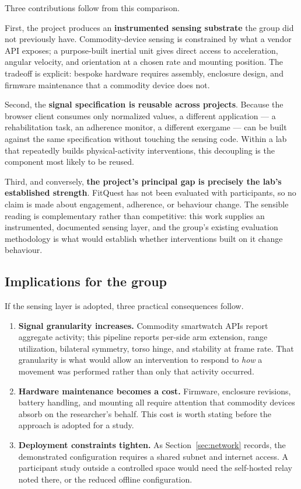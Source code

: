 \documentclass[11pt,a4paper]{article}
\begin{document}
Three contributions follow from this comparison.

First, the project produces an \textbf{instrumented sensing substrate} the group
did not previously have. Commodity-device sensing is constrained by what a
vendor API exposes; a purpose-built inertial unit gives direct access to
acceleration, angular velocity, and orientation at a chosen rate and mounting
position. The tradeoff is explicit: bespoke hardware requires assembly,
enclosure design, and firmware maintenance that a commodity device does not.

Second, the \textbf{signal specification is reusable across projects}. Because
the browser client consumes only normalized values, a different application
--- a rehabilitation task, an adherence monitor, a different exergame --- can be
built against the same specification without touching the sensing code. Within a
lab that repeatedly builds physical-activity interventions, this decoupling is
the component most likely to be reused.

Third, and conversely, \textbf{the project's principal gap is precisely the
lab's established strength}. FitQuest has not been evaluated with participants,
so no claim is made about engagement, adherence, or behaviour change. The
sensible reading is complementary rather than competitive: this work supplies an
instrumented, documented sensing layer, and the group's existing evaluation
methodology is what would establish whether interventions built on it change
behaviour.

\subsection{Implications for the group}

If the sensing layer is adopted, three practical consequences follow.

\begin{enumerate}
\item \textbf{Signal granularity increases.} Commodity smartwatch APIs report
aggregate activity; this pipeline reports per-side arm extension, range
utilization, bilateral symmetry, torso hinge, and stability at frame rate. That
granularity is what would allow an intervention to respond to \emph{how} a
movement was performed rather than only that activity occurred.

\item \textbf{Hardware maintenance becomes a cost.} Firmware, enclosure
revisions, battery handling, and mounting all require attention that commodity
devices absorb on the researcher's behalf. This cost is worth stating before the
approach is adopted for a study.

\item \textbf{Deployment constraints tighten.} As Section~\ref{sec:network}
records, the demonstrated configuration requires a shared subnet and internet
access. A participant study outside a controlled space would need the
self-hosted relay noted there, or the reduced offline configuration.
\end{enumerate}
\end{document}
